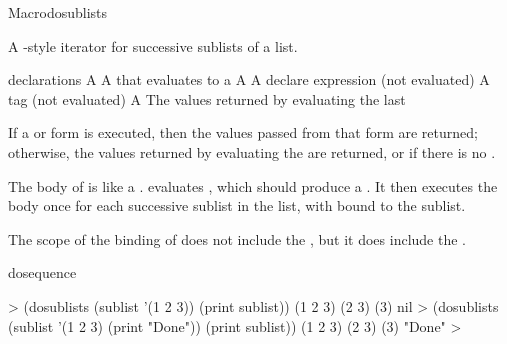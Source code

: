 \documentclass[10pt,twoside,english,pdftex]{article}
\begin{document}

\begin{functiondoc}{Macro}{dosublists}{%
    }
%
  
\fnsyntax

\fnpurpose A -style iterator for successive sublists of a list.

\fnpackage {}

\fnmodule {}

\fnargs
\begin{args}{declarations}
\arg[var] A 
 A  that evaluates to a 
 A 
\arg[declarations] A declare expression (not evaluated)
\arg[tag] A  tag (not evaluated)
\arg[form] A 
\arg[results] The values returned by evaluating the last 
\end{args}

\fnreturns If a  or  form is executed,
then the values passed from that form are returned; otherwise, the values
returned by evaluating the  are returned, or \nil{}
if there is no .

\fndescription The body of  is like a
.   evaluates
, which should produce a . It then executes
the body once for each successive sublist in the list, with  bound
to the sublist.

The scope of the binding of  does not include the
, but it does include the .

\begin{alsos}{dosequence}
\also[dosequence]
\end{alsos}

\fnexamples
%
\W\supp
\begin{example}
  > (dosublists (sublist '(1 2 3)) (print sublist))
  (1 2 3)
  (2 3) 
  (3) 
  nil\goodpagebreak
  > (dosublists (sublist '(1 2 3) (print "Done")) (print sublist))
  (1 2 3)
  (2 3) 
  (3) 
  "Done"
  >
\end{example}

\end{functiondoc}
\end{document}
